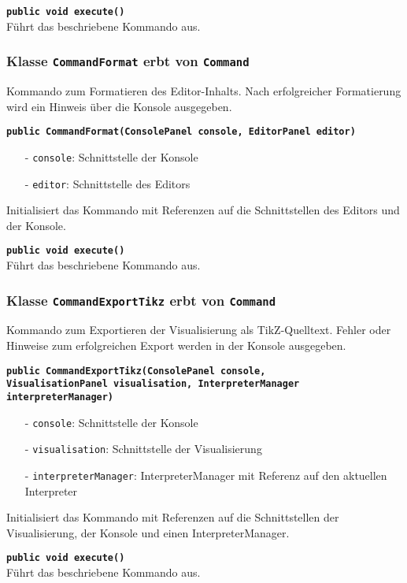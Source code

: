 \documentclass[parskip=full,11pt,twoside]{scrartcl}
\begin{document}
\textbf{\texttt{public void execute()}}\\
Führt das beschriebene Kommando aus.

\subsubsection{Klasse \texttt{CommandFormat} erbt von \texttt{Command}}

Kommando zum Formatieren des Editor-Inhalts. Nach erfolgreicher Formatierung wird ein Hinweis über die Konsole ausgegeben.

\textbf{\texttt{public CommandFormat(ConsolePanel console, EditorPanel editor)}}
\begin{itemize}[noitemsep]
	\item[-] \texttt{console}: Schnittstelle der Konsole
	\item[-] \texttt{editor}: Schnittstelle des Editors
\end{itemize}
Initialisiert das Kommando mit Referenzen auf die Schnittstellen des Editors und der Konsole.

\textbf{\texttt{public void execute()}}\\
Führt das beschriebene Kommando aus.

\subsubsection{Klasse \texttt{CommandExportTikz} erbt von \texttt{Command}}

Kommando zum Exportieren der Visualisierung als TikZ-Quelltext. Fehler oder Hinweise zum erfolgreichen Export werden in der Konsole ausgegeben.

\textbf{\texttt{public CommandExportTikz(ConsolePanel console,\\VisualisationPanel visualisation, InterpreterManager interpreterManager)}}
\begin{itemize}[noitemsep]
	\item[-] \texttt{console}: Schnittstelle der Konsole
	\item[-] \texttt{visualisation}: Schnittstelle der Visualisierung
	\item[-] \texttt{interpreterManager}: InterpreterManager mit Referenz auf den aktuellen Interpreter
\end{itemize}
Initialisiert das Kommando mit Referenzen auf die Schnittstellen der Visualisierung, der Konsole und einen InterpreterManager.

\textbf{\texttt{public void execute()}}\\
Führt das beschriebene Kommando aus.
\end{document}
